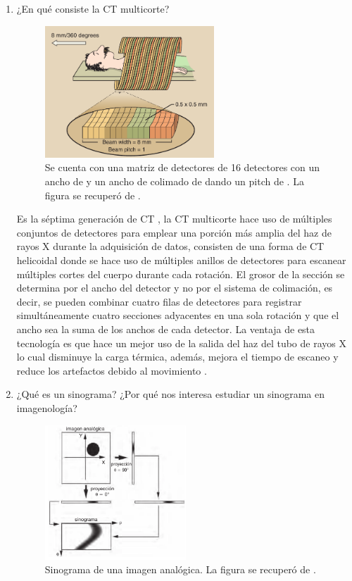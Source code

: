 \begin{enumerate}[1.]
\item ¿En qué consiste la CT multicorte?

\begin{figure}[!ht]
  \centering
  \includegraphics[width=0.6\textwidth]{./figuras/p3_ct.png}
  \caption{Se cuenta con una matriz de detectores de 16 detectores con un ancho de  y un ancho de colimado de  dando un pitch de . La figura se recuperó de \citep{stewart}.}
  \label{p3:ct}
  \end{figure}


Es la séptima generación de CT \citep{IM}, la CT multicorte hace uso de múltiples conjuntos de detectores para emplear una porción más amplia del haz de rayos X durante la adquisición de datos, consisten de una forma de CT  helicoidal donde se hace uso de múltiples anillos de detectores para escanear múltiples cortes del cuerpo durante cada rotación. El grosor de la sección se determina por el ancho del detector y no por el sistema de colimación, es decir, se pueden combinar cuatro filas de detectores para registrar simultáneamente cuatro secciones adyacentes en una sola rotación y que el ancho sea la suma de los anchos de cada detector. La ventaja de esta tecnología es que hace un mejor uso de la salida del haz del tubo de rayos X lo cual disminuye la carga térmica, además, mejora el tiempo de escaneo y reduce los artefactos debido al movimiento \citep{jerro,russ}.


\pagebreak

\item ¿Qué es un sinograma? ¿Por qué nos interesa estudiar un sinograma en imagenología?


\begin{figure}[!ht]
  \centering
  \includegraphics[width=0.5\textwidth]{./figuras/p4_sino.png}
  \caption{Sinograma de una imagen analógica. La figura se recuperó de \citep{andre}.}
  \label{p4:sino}
  \end{figure}


\end{enumerate}
